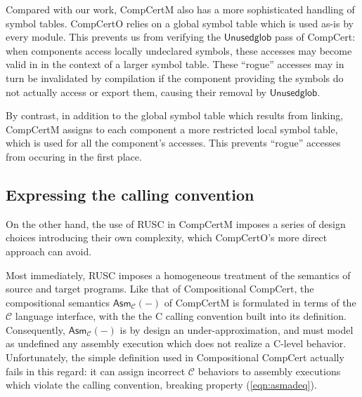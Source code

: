 \documentclass[sigplan,10pt,review]{acmart}
\newcommand{\kw}[1]{\ensuremath{ \mathsf{#1} }}
\begin{document}
Compared with our work,
CompCertM also has a more sophisticated handling
of symbol tables.
CompCertO relies on a global symbol table
which is used as-is by every module.
This prevents us
from verifying the \kw{Unusedglob} pass of CompCert:
when components access locally undeclared symbols,
these accesses may become valid in
in the context of a larger symbol table.
These ``rogue'' accesses may in turn be invalidated by compilation
if the component providing the symbols
do not actually access or export them,
causing their removal by \kw{Unusedglob}.

By contrast,
in addition to the global symbol table which results from linking,
CompCertM assigns to each component
a more restricted local symbol table,
which is used for all the component's accesses.
This prevents ``rogue'' accesses
from occuring in the first place.


\subsection{Expressing the calling convention} %

On the other hand,
the use of RUSC in CompCertM imposes a series of design choices
introducing their own complexity,
which CompCertO's more direct approach can avoid.

Most immediately,
RUSC imposes a homogeneous
treatment of the semantics of source and target programs.
Like that of Compositional CompCert,
the compositional semantics $\kw{Asm}_\mathcal{C}(-)$
of CompCertM
is formulated in terms of the $\mathcal{C}$ language interface,
with the the C calling convention built into its definition.
Consequently, $\kw{Asm}_\mathcal{C}(-)$ is by design an under-approximation,
and must model as undefined any assembly execution
which does not realize a C-level behavior.
Unfortunately,
the simple definition used in Compositional CompCert
actually fails in this regard:
it can assign incorrect $\mathcal{C}$ behaviors
to assembly executions which violate the calling convention,
breaking property (\ref{eqn:asmadeq}).
\end{document}
